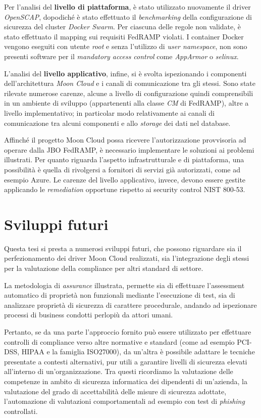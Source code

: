 \documentclass[../main.tex]{subfiles}
\begin{document}
Per l'analisi del \textbf{livello di piattaforma}, è stato utilizzato nuovamente il driver \textit{OpenSCAP}, dopodiché è stato effettuato il \textit{benchmarking} della configurazione di sicurezza del cluster \textit{Docker Swarm}. Per ciascuna delle regole non validate, è stato effettuato il mapping sui requisiti FedRAMP violati.
I container Docker vengono eseguiti con utente \textit{root} e senza l'utilizzo di \textit{user namespace}, non sono presenti software per il \textit{mandatory access control} come \textit{AppArmor} o \textit{selinux}. 
 
L'analisi del \textbf{livello applicativo}, infine, si è svolta ispezionando i componenti dell'architettura \textit{Moon Cloud} e i canali di comunicazione tra gli stessi. Sono state rilevate numerose carenze, alcune a livello di configurazione quindi comprensibili in un ambiente di sviluppo (appartenenti alla classe \textit{CM} di FedRAMP), altre a livello implementativo; in particolar modo relativamente ai canali di comunicazione tra alcuni componenti e allo \textit{storage} dei dati nel database.

Affinché il progetto Moon Cloud possa ricevere l'autorizzazione provvisoria ad operare dalla JBO FedRAMP, è necessario implementare le soluzioni ai problemi illustrati.
Per quanto riguarda l'aspetto infrastrutturale e di piattaforma, una possibilità è quella di rivolgersi a fornitori di servizi già autorizzati, come ad esempio Azure.
Le carenze del livello applicativo, invece, devono essere gestite applicando le \textit{remediation} opportune rispetto ai security control NIST 800-53.

\section {Sviluppi futuri}
Questa tesi si presta a numerosi sviluppi futuri, che possono riguardare sia il perfezionamento dei driver Moon Cloud realizzati, sia l'integrazione degli stessi per la valutazione della compliance per altri standard di settore.

La metodologia di \textit{assurance} illustrata, permette sia di effettuare l'assessment automatico di proprietà non funzionali mediante l'esecuzione di test, sia di analizzare proprietà di sicurezza di carattere procedurale, andando ad ispezionare processi di business condotti perlopiù da attori umani.

Pertanto, se da una parte l'approccio fornito può essere utilizzato per effettuare controlli di compliance verso altre normative e standard (come ad esempio PCI-DSS, HIPAA e la famiglia ISO27000), da un'altra è possibile adattare le tecniche presentate a contesti alternativi, pur utili a garantire livelli di sicurezza elevati all'interno di un'organizzazione.
Tra questi ricordiamo la valutazione delle competenze in ambito di sicurezza informatica dei dipendenti di un'azienda, la valutazione del grado di accettabilità delle misure di sicurezza adottate, l'automazione di valutazioni comportamentali ad esempio con test di \textit{phishing} controllati.
\end{document}
